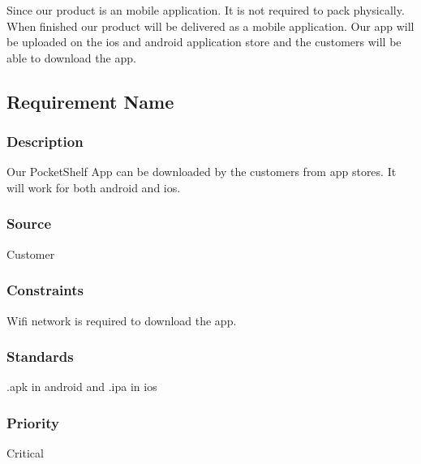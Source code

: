 Since our product is an mobile application. It is not required to pack physically. When finished our product will be delivered as a mobile application. Our app will be uploaded on the ios and android application store and the customers will be able to download the app.

\subsection{Requirement Name}
\subsubsection{Description}
Our PocketShelf App can be downloaded by the customers from app stores. It will work for both android and ios.
\subsubsection{Source}
Customer
\subsubsection{Constraints}
Wifi network is required to download the app.
\subsubsection{Standards}
.apk in android and .ipa in ios
\subsubsection{Priority}
Critical